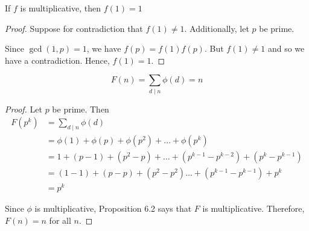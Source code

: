 \begin{lemma}
    If $f$ is multiplicative, then $f(1) = 1$
\end{lemma}
\begin{proof}
    Suppose for contradiction that $f(1) \neq 1$. Additionally, let $p$ be
    prime.
    
    Since $\gcd(1, p) = 1$, we have $f(p) = f(1)f(p)$. But $f(1) \neq 1$ and so 
    we have a contradiction. Hence, $f(1) = 1$. 
\end{proof}


\begin{prop}[part b]
    \[ F(n) = \sum_{d \mid n} \phi(d) = n \]
\end{prop}
\begin{proof}
    Let $p$ be prime. Then
    \begin{align*}
    F(p^k) &= \sum_{d \mid n} \phi(d) \\
           &= \phi(1) + \phi(p) + \phi(p^2) + \ldots + \phi(p^k) \\
           &= 1 + (p-1) + (p^2 - p) + \ldots + (p^{k-1} - p^{k-2}) + (p^k - p^{k-1}) \\
           &= (1-1) + (p-p) + (p^2 - p^2) \ldots + (p^{k-1} - p^{k-1}) + p^k \\
           &= p^k
    \end{align*}    

    Since $\phi$ is multiplicative, Proposition 6.2 says that $F$ is
    multiplicative. Therefore, $F(n) = n$ for all $n$.
\end{proof}

